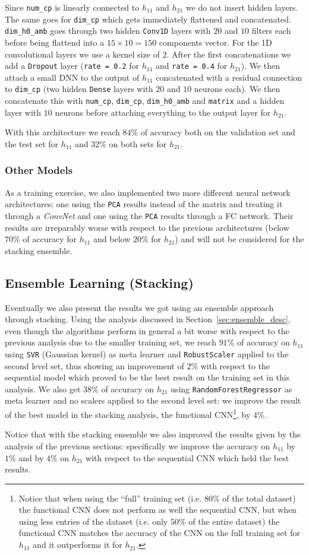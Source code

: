         Since \texttt{num\_cp} is linearly connected to $h_{11}$ and $h_{21}$ we do not insert hidden layers. The same goes for \texttt{dim\_cp} which gets immediately flattened and concatenated. \texttt{dim\_h0\_amb} goes through two hidden \texttt{Conv1D} layers with $20$ and $10$ filters each before being flattend into a $15 \times 10 = 150$ components vector. For the 1D convolutional layers we use a kernel size of $2$. After the first concatenations we add a \texttt{Dropout} layer (\texttt{rate = 0.2} for $h_{11}$ and \texttt{rate = 0.4} for $h_{21}$). We then attach a small DNN to the output of $h_{11}$ concatenated with a residual connection to \texttt{dim\_cp} (two hidden \texttt{Dense} layers with $20$ and $10$ neurons each). We then concatenate this with \texttt{num\_cp}, \texttt{dim\_cp}, \texttt{dim\_h0\_amb} and \texttt{matrix} and a hidden layer with $10$ neurons before attaching everything to the output layer for $h_{21}$.
        
        With this architecture we reach $84\%$ of accuracy both on the validation set and the test set for $h_{11}$ and $32\%$ on both sets for $h_{21}$.
        
    \subsubsection{Other Models}
        As a training exercise, we also implemented two more different neural network architectures: one using the \texttt{PCA} results instead of the matrix and treating it through a \textit{ConvNet} and one using the \texttt{PCA} results through a FC network. Their results are irreparably worse with respect to the previous architectures (below $70\%$ of accuracy for $h_{11}$ and below $20\%$ for $h_{21}$) and will not be considered for the stacking ensemble.
        
\subsection{Ensemble Learning (Stacking)}
    Eventually we also present the results we got using an ensemble approach through stacking. Using the analysis discussed in Section~\ref{sec:ensemble_desc}, even though the algorithms perform in general a bit worse with respect to the previous analysis due to the smaller training set, we reach $91\%$ of accuracy on $h_{11}$ using \texttt{SVR} (Gaussian kernel) as meta learner and \texttt{RobustScaler} applied to the second level set, thus showing an improvement of $2\%$ with respect to the sequential model which proved to be the best result on the training set in this analysis. We also get $38\%$ of accuracy on $h_{21}$ using \texttt{RandomForestRegressor} as meta learner and no scalers applied to the second level set: we improve the result of the best model in the stacking analysis, the functional CNN\footnote{Notice that when using the ``full'' training set (i.e. $80\%$ of the total dataset) the functional CNN does not perform as well the sequential CNN, but when using less entries of the dataset (i.e. only $50\%$ of the entire dataset) the functional CNN matches the accuracy of the CNN on the full training set for $h_{11}$ and it outperforms it for $h_{21}$.}, by $4\%$.
    
    Notice that with the stacking ensemble we also improved the results given by the analysis of the previous sections: specifically we improve the accuracy on $h_{11}$ by $1\%$ and by $4\%$ on $h_{21}$ with respect to the sequential CNN which held the best results.